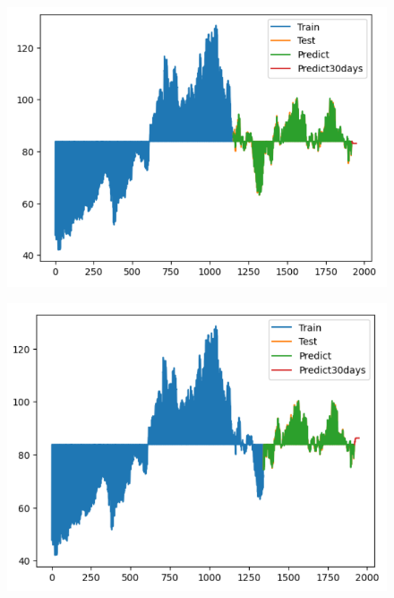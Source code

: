\documentclass{article}
\begin{document}
\begin{multicols}{2}
\begin{figure}[H]
    \centering
    \begin{minipage}{0.15\textwidth}
    \centering
    \includegraphics[width=1\textwidth]{Image/GradientBoosting/SONY_30_6_4_GradientBoostingRegressor.png}
   
    \label{fig:1}
    \end{minipage}%
    \begin{minipage}{0.15\textwidth}
    \centering
    \includegraphics[width=1\textwidth]{Image/GradientBoosting/SONY_30_7_3_GradientBoostingRegressor.png}
  

\end{minipage}
\end{figure}
\end{multicols}
\end{document}
